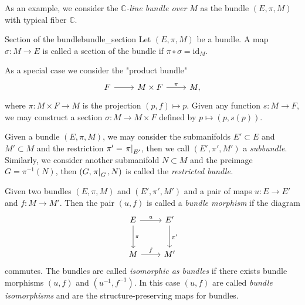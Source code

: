 As an example, we consider the \emph{\(\mathbb{C}\)-line bundle over \(M\)} as the bundle \((E, \pi, M)\) with typical fiber \(\mathbb{C}\).

\begin{definition}{Section of the bundle}{bundle_section}
    Let \((E, \pi, M)\) be a bundle. A map \(\sigma : M \to E\) is called a section of the bundle if \(\pi \circ \sigma = \mathrm{id}_M\).
\end{definition}

As a special case we consider the "product bundle"
\begin{equation*}
    \begin{tikzcd}[column sep = normal, row sep = large]
        F \arrow{r}{} & M \times F \arrow{r}{\pi} & M,
    \end{tikzcd}
\end{equation*}
where \(\pi : M \times F \to M\) is the projection \((p, f) \mapsto p\). Given any function \(s : M \to F\), we may construct a section \(\sigma : M \to M \times F\) defined by \(p\mapsto (p, s(p))\). %

Given a bundle \((E, \pi, M)\), we may consider the submanifolds \(E' \subset E\) and \(M' \subset M\) and the restriction \(\pi' = \left.\pi\right\rvert_{E'}\), then we call \((E', \pi', M')\) a \emph{subbundle}. Similarly, we consider another submanifold \(N \subset M\) and the preimage \(G = \pi^{-1}(N)\), then \((G, \left.\pi\right\rvert_{G}, N)\) is called the \emph{restricted bundle.}

Given two bundles \((E, \pi, M)\) and \((E', \pi', M')\) and a pair of maps \(u: E \to E'\) and \(f: M \to M'\). Then the pair \((u,f)\) is called a \emph{bundle morphism} if the diagram
\begin{equation*}
    \begin{tikzcd}[column sep = normal, row sep = large]
        E \arrow{r}{u} \arrow{d}{\pi} & E' \arrow{d}{\pi'}\\
        M \arrow{r}{f} & M'
    \end{tikzcd}
\end{equation*}
commutes. The bundles are called \emph{isomorphic as bundles} if there exists bundle morphisms \((u, f)\) and \((u^{-1}, f^{-1})\). In this case \((u,f)\) are called \emph{bundle isomorphisms} and are the structure-preserving maps for bundles.

